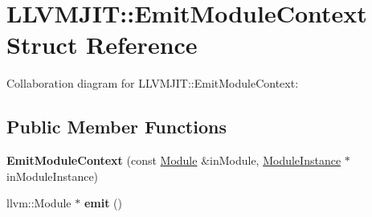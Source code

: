 \hypertarget{struct_l_l_v_m_j_i_t_1_1_emit_module_context}{}\section{L\+L\+V\+M\+J\+IT\+:\+:Emit\+Module\+Context Struct Reference}
\label{struct_l_l_v_m_j_i_t_1_1_emit_module_context}


Collaboration diagram for L\+L\+V\+M\+J\+IT\+:\+:Emit\+Module\+Context\+:
\subsection*{Public Member Functions}
\begin{DoxyCompactItemize}
\item 
\mbox{\label{struct_l_l_v_m_j_i_t_1_1_emit_module_context_a732dd89f2a97ecad652776d08be84d3d}} 
{\bfseries Emit\+Module\+Context} (const \mbox{\hyperlink{struct_i_r_1_1_module}{Module}} \&in\+Module, \mbox{\hyperlink{struct_runtime_1_1_module_instance}{Module\+Instance}} $\ast$in\+Module\+Instance)
\item 
\mbox{\label{struct_l_l_v_m_j_i_t_1_1_emit_module_context_aeb19b5423011ca427dd60cd280c37a24}} 
llvm\+::\+Module $\ast$ {\bfseries emit} ()
\end{DoxyCompactItemize}
